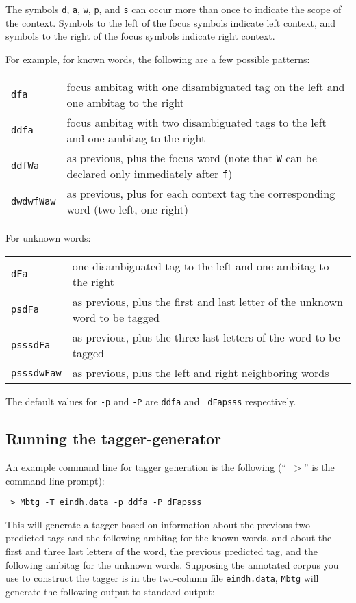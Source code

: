 \documentclass{report}
\begin{document}
The symbols {\tt d}, {\tt a}, {\tt w}, {\tt p}, and {\tt s} can occur
more than once to indicate the scope of the context. Symbols to the
left of the focus symbols indicate left context, and symbols to the
right of the focus symbols indicate right context.

For example, for known words, the following are a few possible patterns: 

\begin{tabular}{ll}
{\tt dfa}  & focus ambitag with one disambiguated tag on the left and one ambitag to the right \\
{\tt ddfa} & focus ambitag with two disambiguated tags to the left and one ambitag to the right \\ 
{\tt ddfWa} & as previous, plus the focus word (note that {\tt W} can be declared only immediately after {\tt f}) \\
{\tt dwdwfWaw} & as previous, plus for each context tag the corresponding word (two left, one right)\\ 
\end{tabular}

For unknown words:

\begin{tabular}{ll}
{\tt dFa} & one disambiguated tag to the left and one ambitag to the right \\
{\tt psdFa} & as previous, plus the first and last letter of the unknown word to be tagged \\ 
{\tt psssdFa} & as previous, plus the three last letters of the word to be tagged \\
{\tt psssdwFaw} & as previous, plus the left and right neighboring words \\
\end{tabular}

The default values for {\tt -p} and {\tt -P} are {\tt ddfa} and {\tt
  dFapsss} respectively. 

\subsection{Running the tagger-generator}

An example command line for tagger generation is the following (``{\tt
$>$}'' is the command line prompt):

{\small
\begin{verbatim}
 > Mbtg -T eindh.data -p ddfa -P dFapsss
\end{verbatim}
}

This will generate a tagger based on information about the previous
two predicted tags and the following ambitag for the known words, and
about the first and three last letters of the word, the previous predicted
tag, and the following ambitag for the unknown words. Supposing the
annotated corpus you use to construct the tagger is in the two-column
file {\tt eindh.data}, {\tt Mbtg} will generate the following output
to standard output:
\end{document}
